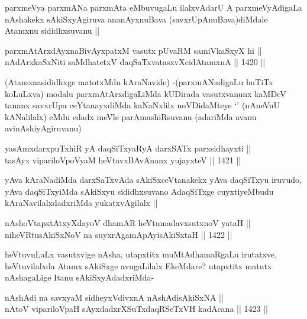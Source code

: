 \begin{artha}
parxmeVya parxmANa parxmAta eMbuvugaLu ilalxvAdarU A parxmeVyAdigaLa nAshakekx sAkiSxyAgiruva ananAyxnuBava (savxrUpAnuBava)diMdale Atamxnu sididhxsuvanu ||
\end{artha}

\begin{shl}
parxmAtArxdAyxnaBivAyxpatxM vasutx pUvaRM samiVkaSxyX hi || \\
nAdArxkaSxNiti saMdhatetxV daqSaTxvatasxvXcidAtamxnA ||  1420 ||  
\end{shl}

\begin{artha}
(Atamxnasididhxge matotxMdu kAraNavide) -(parxmANadigaLu huTiTx koLuLxva) modalu parxmAtArxdigaLiMda kUDirada vasutxvanunx kaMDeV tananx savxrUpa ceYtanayxdiMda kaNaNxlilx noVDidaMteye `\stext' (nAneVnU kANalilalx) eMdu edadx meVle parAmashiRsuvanu (adariMda avanu avinAshiyAgiruvanu)
\end{artha}


\begin{shl}
yasAmxdarxpuTxhiR yA daqSiTxyaRyA darxSATx parxsidhayxti || \\
tasAyx vipariloVpoV\s yaM heVtavxBAvAnanx yujayxteV ||  1421 ||  
\end{shl}

\begin{artha}
yAva kAraNadiMda darxSaTxvAda sAkiSxceVtanakekx yAva daqSiTxyu iruvudo, yAva daqSiTxyiMda sAkiSxyu sididhxsuvano AdaqSiTxge cuyxtiyeMbudu kAraNavilalxdadxriMda yukatxvAgilalx ||
\end{artha}


\begin{shl}
nAshoVtapxtAtxyXdayoV dhamAR heVtumadavxsutxnoV yataH || \\
niheVRtusAkiSxNoV na suyxrAgamApAyisAkiSxtaH ||  1422 ||  
\end{shl}

\begin{artha}
heVtuvuLaLx vasutxvige nAsha, utapxtitx muMtAdhamaRgaLu irutatxve, heVtuvilalxda Atamx sAkiSxge avugaLilalx EkeMdare? utapxtitx matutx nAshagaLige Itanu sAkiSxyAdadxriMda-
\end{artha}


\begin{shl}
nAshAdi na savxyaM sidheyxVdivxnA nAshAdisAkiSxNA || \\
nAtoV vipariloVpaH sAyxdadxrXSuTxdaqRSeTxVH kadAcana ||  1423 ||  
\end{shl}

